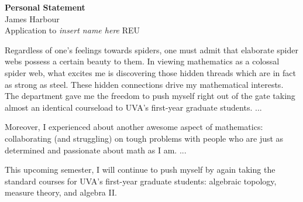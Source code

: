 \documentclass[12pt]{article}
\begin{document}
\begin{center}
  \textbf{Personal Statement}\\
  James Harbour \\
  Application to \emph{insert name here} REU
\end{center}


Regardless of one's feelings towards spiders, one must admit that elaborate spider webs possess a certain beauty to them. In viewing mathematics as a colossal spider web, what excites me is discovering those hidden threads which are in fact as strong as steel. These hidden connections drive my mathematical interests.
 \\






%




The department gave me the freedom to push myself right out of the gate taking almost an identical courseload to UVA's first-year graduate students. ...


Moreover, I experienced about another awesome aspect of mathematics: collaborating (and struggling) on tough problems with people who are just as determined and passionate about math as I am. ...

This upcoming semester, I will continue to push myself by again taking the standard courses for UVA's first-year graduate students: algebraic topology, measure theory, and algebra II.
\\




\end{document}
